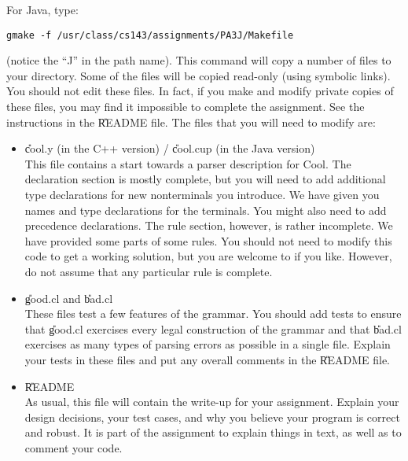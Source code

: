 \documentclass[11pt]{article}
\begin{document}
\noindent For Java, type:

\begin{verbatim}
gmake -f /usr/class/cs143/assignments/PA3J/Makefile
\end{verbatim}

\noindent
(notice the ``J'' in the path name).  This command will copy a number of
files to your directory.  Some of the files will be copied read-only
(using symbolic links).  You should not edit these files.  In fact, if
you make and modify private copies of these files, you may find it
impossible to complete the assignment.  See the instructions in the
\U{README} file.  The files that you will need to modify are:

\begin{itemize}

\item \U{cool.y} (in the C++ version) / \U{cool.cup} (in the Java version) \\

This file contains a start towards a parser description for Cool.  The
declaration section is mostly complete, but you will need to add
additional type declarations for new nonterminals you introduce.  We
have given you names and type declarations for the terminals.  You
might also need to add precedence declarations.  The rule section,
however, is rather incomplete.  We have provided some parts of some
rules.  You should not need to modify this code to get a working
solution, but you are welcome to if you like.  However, do not assume
that any particular rule is complete.

\item \U{good.cl} and \U{bad.cl} \\
These files test a few features of the grammar.  You should add tests
to ensure that \U{good.cl} exercises every legal construction of the
grammar and that \U{bad.cl} exercises as many types of parsing errors
as possible in a single file.  Explain your tests in these files and
put any overall comments in the \U{README} file.

\item \U{README} \\
As usual, this file will contain the write-up for your assignment.
Explain your design decisions, your test cases, and why you believe
your program is correct and robust.  It is part of the assignment to
explain things in text, as well as to comment your code. 

\end{itemize}
\end{document}

